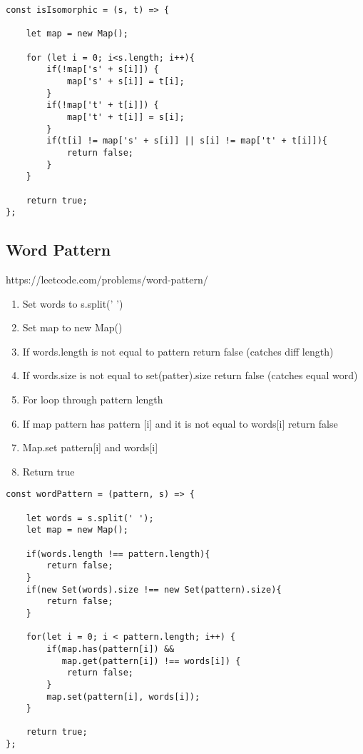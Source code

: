 \documentclass[10pt]{article}
\begin{document}
\begin{lstlisting}[title=Solution isIsomorphic, captionpos=t]
const isIsomorphic = (s, t) => {
    
    let map = new Map();

    for (let i = 0; i<s.length; i++){
        if(!map['s' + s[i]]) {
            map['s' + s[i]] = t[i];
        } 
        if(!map['t' + t[i]]) {
            map['t' + t[i]] = s[i];
        }
        if(t[i] != map['s' + s[i]] || s[i] != map['t' + t[i]]){  
            return false;
        } 
    }
    
    return true;
};
\end{lstlisting}

\medskip %











\pagebreak %
\medskip   
\subsection{Word Pattern}
https://leetcode.com/problems/word-pattern/

\begin{enumerate}
	\item Set words to s.split(' ')
	\item Set map to new Map()
	\item If words.length is not equal to pattern return false (catches diff length)
	\item If words.size is not equal to set(patter).size return false (catches equal word)
	\item For loop through pattern length 
	\item If map pattern has pattern [i] and it is not equal to words[i] return false
	\item Map.set pattern[i]  and words[i]
	\item Return true
\end{enumerate}

\begin{lstlisting}[title=Solution wordPattern, captionpos=t]
const wordPattern = (pattern, s) => {
    
    let words = s.split(' ');
    let map = new Map();
    
    if(words.length !== pattern.length){
        return false;
    }
    if(new Set(words).size !== new Set(pattern).size){
        return false;
    } 
    
    for(let i = 0; i < pattern.length; i++) {
        if(map.has(pattern[i]) && 
           map.get(pattern[i]) !== words[i]) {
            return false;
        } 
        map.set(pattern[i], words[i]);
    }
    
    return true;
};
\end{lstlisting}
\medskip %
\end{document}
